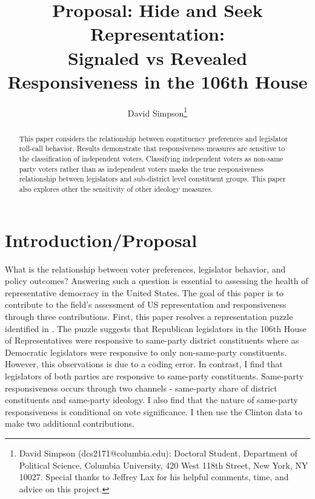 \documentclass[10pt,letterpaper]{article}
\author{David Simpson\footnote{David Simpson (dcs2171@columbia.edu): Doctoral Student, Department of Political Science, Columbia University, 420 West 118th Street, New York, NY 10027. Special thanks to Jeffrey Lax for his helpful comments, time, and advice on this project.}}
\title{Proposal: Hide and Seek Representation: \\ 
\large Signaled vs Revealed Responsiveness in the 106th House}
\begin{document}
\maketitle

\begin{abstract}
This paper considers the relationship between constituency preferences and legislator roll-call behavior. Results demonstrate that responsiveness measures are sensitive to the classification of independent voters. Classifying independent voters as non-same party voters rather than as independent voters masks the true responsiveness relationship between legislators and sub-district level constituent groups. This paper also explores other the sensitivity of other ideology measures.
\end{abstract}

\section{Introduction/Proposal}
What is the relationship between voter preferences, legislator behavior, and policy outcomes? Answering such a question is essential to assessing the health of representative democracy in the United States. The goal of this paper is to contribute to the field's assessment of US representation and responsiveness through three contributions. First, this paper resolves a representation puzzle identified in \cite{Clinton2006}. The puzzle suggests that Republican legislators in the 106th House of Representatives were responsive to same-party district constituents where as Democratic legislators were responsive to only non-same-party constituents. However, this observations is due to a coding error. In contrast, I find that legislators of both parties are responsive to same-party constituents. Same-party responsiveness occurs through two channels - same-party share of district constituents and same-party ideology. I also find that the nature of same-party responsiveness is conditional on vote significance. I then use the Clinton data to make two additional contributions.
\end{document}
